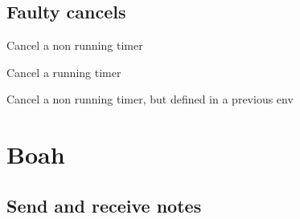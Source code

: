 \documentclass[a4paper]{article}
\begin{document}
\begin{pktxdiag}
 \testtimersi 
\end{pktxdiag}
\begin{pktxdiag}
 \testtimersir
\end{pktxdiag}

\newpage
\subsection{Faulty cancels}

Cancel a non running timer

\begin{pktxdiag}
\end{pktxdiag}
\begin{hpktxdiag}
\end{hpktxdiag}

Cancel a running timer

\begin{pktxdiag}
\end{pktxdiag}

Cancel a non running timer, but defined in a previous env

\begin{pktxdiag}
\end{pktxdiag}
\begin{hpktxdiag}
\end{hpktxdiag}


\def\testtimercancel{
  \AB[timed={2cm}{tada}]{yo}
  \Apause
}

\begin{pktxdiag}
  \testtimercancel
\end{pktxdiag}

\begin{hpktxdiag}
  \testtimercancel
\end{hpktxdiag}

\section{Boah}
\subsection{Send and receive notes}

\begin{pktxdiag}
\end{pktxdiag}
\end{document}
